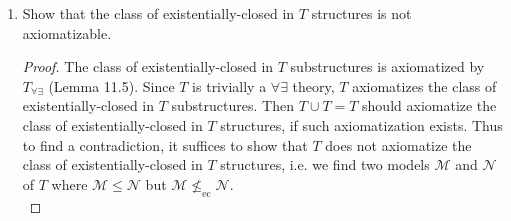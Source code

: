 \documentclass{article}
\begin{document}
\begin{enumerate}[label={\bf Q\arabic*:}]
\begin{enumerate}
        \begin{proof}
          Let $\mathcal{L}'=\mathcal{L}(\mathcal{M})\cup\{b\}$, where $b$
          is a constant that does not appear in $\mathcal{L}(\mathcal{M})$.
          Let
          \[\begin{array}{rrl}
            T' &:= &T_\mathcal{M} \\
              &&\cup \{c_m\neq c_n:m\neq n\in M\} \\
              &&\cup\{R(c_m,b):m\in R(M,a)\} \\
              &&\cup\{b\neq f^n(a):n\in\mathbb{N}\}
          \end{array}\]
          be a theory in the language $\mathcal{L}'$. We show that
          $T'$ is finitely satisfied by $\mathcal{M}$: Assign each $c_m$ to
          $m\in M$. Then clearly $\mathcal{M}$ satisfies all sentences in
          $T_\mathcal{M}$ and also formulas of the form $c_m\neq c_n\in
          T'$ by definition. Given a finite set of formulas
          $\{b\neq f^{0}(a),\ldots,b\neq f^{n}(a)\}\subset T'$, assign $b$
          to $f^{n+1}(a)\in M$. This assignment will satisfy formulas of
          the form $R(c_m,b)\in T'$ for each $m\in R(M,a)$ because $R(m,a)$
          implies $R(m,f^{n+1}(a))$ by induction on $n$. Also, since
          $f^{n+1}(a)\neq f^i(a)$ for all $i<n+1$, the assignment will also
          satisfy the chosen finite set of formulas. \\

          Thus by Compactness theorem $T'$ is satisfied by some model
          $\mathcal{N}$. Then since $T\subset T'$ and $T_\mathcal{M}\subset
          T'$, $\mathcal{N}$ is an elementary extension of $\mathcal{M}$ in
          the original language $\mathcal{L}$, and also
          $\mathcal{N}\models\forall x\; [R(x,a)\rightarrow R(x,b)]$ by our
          choice of $T'$.
        \end{proof}

      \item Show that the class of existentially-closed in $T$ structures
        is not axiomatizable.
        \begin{proof}
          The class of existentially-closed in $T$ substructures is
          axiomatized by $T_{\forall\exists}$ (Lemma 11.5). Since $T$ is
          trivially a $\forall\exists$ theory, $T$ axiomatizes the class of
          existentially-closed in $T$ substructures. Then $T\cup T=T$
          should axiomatize the class of existentially-closed in $T$
          structures, if such axiomatization exists. Thus to find a
          contradiction, it suffices to show that $T$ does not axiomatize
          the class of existentially-closed in $T$ structures, i.e. we find
          two models $\mathcal{M}$ and $\mathcal{N}$ of $T$ where
          $\mathcal{M}\leq\mathcal{N}$ but
          $\mathcal{M}\not\leq_{\text{ec}}\mathcal{N}$. \\


\end{proof}
\end{enumerate}
\end{enumerate}
\end{document}
